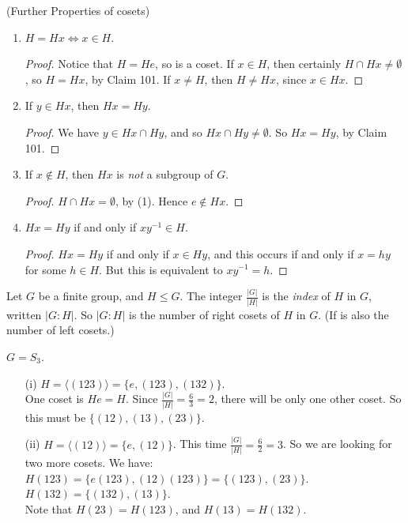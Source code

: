 \documentclass[twoside]{scrartcl}
\begin{document}
\begin{remarks} (Further Properties of cosets) \begin{enumerate}
 \item  $H = Hx \iff x \in H$.\begin{proof}
Notice that $H = He$, so is a coset. If $x \in H$, then certainly $H \cap Hx \neq \emptyset$, so $H = Hx$, by Claim 101.	If $x \neq H$, then $H \neq Hx$, since $x \in Hx$.
\end{proof}
\item If $y \in Hx$, then $Hx = Hy$. \begin{proof}
 We have $y \in Hx \cap Hy$, and so $Hx \cap Hy \neq \emptyset$. So $Hx = Hy$, by Claim 101.	
 \end{proof}
 
 \item If $x \not\in H$, then $Hx$ is \emph{not} a subgroup of $G$. \begin{proof}
 	$H \cap Hx = \emptyset$, by (1). Hence $e \not\in Hx$. 
 \end{proof}

\item $Hx = Hy$ if and only if $xy^{-1} \in H$.\begin{proof}
$Hx = Hy$ if and only if $x \in Hy$, and this occurs if and only if $x = hy$ for some $h \in H$. But this is equivalent to $xy^{-1} = h$.	
\end{proof}
 \end{enumerate}
 \end{remarks} \vspace*{10pt}

\begin{definition} Let $G$ be a finite group, and $H \leq G$. The integer $\frac{|G|}{|H|}$ is the \emph{index} of $H$ in $G$, written $|G : H|$. So $|G:H|$ is the number of right cosets of $H$ in $G$. (If is also the number of left cosets.)	
\end{definition}\vspace*{10pt}


\begin{examples} $G = S_3$. \begin{enumerate}
 \item[(i)] $H = \langle (123) \rangle = \{e,(123),(132)\}$.\\[-0.3cm]
 
 One coset is $He = H$. Since $\frac{|G|}{|H|} = \frac{6}{3} = 2$, there will be only one other coset. So this must be $\{(12),(13),(23)\}$.
 
 \item[(ii)] $H = \langle (12) \rangle = \{e,(12)\}$. This time $\frac{|G|}{|H|} = \frac{6}{2} = 3$. So we are looking for two more cosets. We have:\\[-0.3cm]
 
  $H(123) = \{e(123),(12)(123)\} = \{(123),(23)\}$.\\
   $H(132) = \{(132),(13)\}$.\\[-0.3cm]
 
 Note that $H(23) = H(123)$, and $H(13) = H(132)$.
 \end{enumerate}
 \end{examples}\vspace*{10pt}
 
\end{document}
